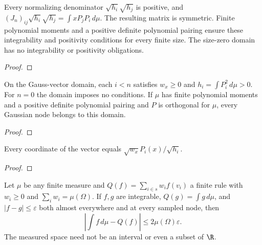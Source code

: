 \begin{supporting}

\begin{theorem}
\label{thm:normalized-jacobi-characterisation}
\leanok
Every normalizing denominator $\sqrt{h_i}\sqrt{h_j}$ is positive, and
$(J_n)_{ij}\sqrt{h_i}\sqrt{h_j}=\int xP_jP_i\,d\mu$.
The resulting matrix is symmetric. Finite polynomial moments and a positive
definite polynomial pairing ensure these integrability and positivity conditions for every finite size.
The size-zero domain has no integrability or positivity obligations.
\end{theorem}
\begin{proof}
\leanok
\end{proof}

\begin{theorem}
\label{thm:gauss-vector-input}
\leanok
On the Gauss-vector domain, each $i<n$ satisfies $w_x\ge0$ and
$h_i=\int P_i^2\,d\mu>0$. For $n=0$ the domain imposes no conditions.
If $\mu$ has finite polynomial moments and a positive definite polynomial
pairing and $P$ is orthogonal for $\mu$, every Gaussian node belongs to this domain.
\end{theorem}
\begin{proof}
\leanok
\end{proof}

\begin{theorem}
\label{thm:gauss-vector-formula}
\leanok
Every coordinate of the vector equals $\sqrt{w_x}P_i(x)/\sqrt{h_i}$.
\end{theorem}
\begin{proof}
\leanok
\end{proof}

\begin{theorem}
\label{thm:positive-quadrature-error}
\leanok
Let $\mu$ be any finite measure and $Q(f)=\sum_{i\in s}w_i f(v_i)$ a finite
rule with $w_i\ge0$ and $\sum_iw_i=\mu(\Omega)$. If $f,g$ are integrable,
$Q(g)=\int g\,d\mu$, and $|f-g|\le\varepsilon$ both almost everywhere and
at every sampled node, then
\[
 \left|\int f\,d\mu-Q(f)\right|\le2\mu(\Omega)\varepsilon.
\]
The measured space need not be an interval or even a subset of $\R$.


\end{theorem}
\end{supporting}
